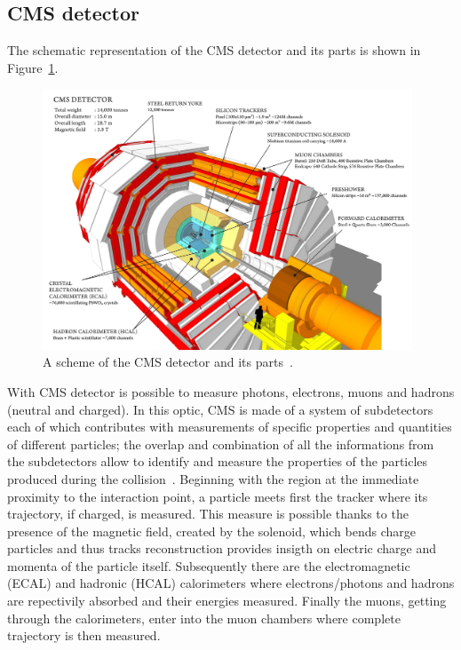 \subsection{CMS detector} 
The schematic representation of the CMS detector and its parts is
shown in Figure~\ref{fig:detector}.
\begin{figure}[h]
\centering
\includegraphics[width=0.98\textwidth]{Figures/c2/cms_160312_06-compressed.pdf}
\vspace*{3mm}
\caption{A scheme of the CMS detector and its parts~\cite{webpage_cms}.}
\label{fig:detector}
\end{figure} 

With CMS detector is possible to measure photons, electrons, muons and hadrons (neutral and charged). 
In this optic, CMS is made of a system of subdetectors each of which contributes with
measurements of specific properties and quantities of different 
particles; the overlap and combination of all the
informations from the subdetectors allow to identify and measure the
properties of the particles produced during the collision~\cite{Sirunyan_2017}. Beginning
with the region at the immediate proximity to the interaction point, a
particle meets first the tracker where its trajectory, if charged, is
measured. This measure is possible thanks to the presence of the
magnetic field, created by the solenoid, which bends charge particles
and thus tracks reconstruction provides insigth on electric charge and
momenta of the particle itself. Subsequently there are the
electromagnetic (ECAL) and hadronic (HCAL) calorimeters where
electrons/photons and hadrons are repectivily absorbed and their
energies measured. Finally the muons, getting through the
calorimeters, enter into the muon chambers where complete trajectory
is then measured. 





